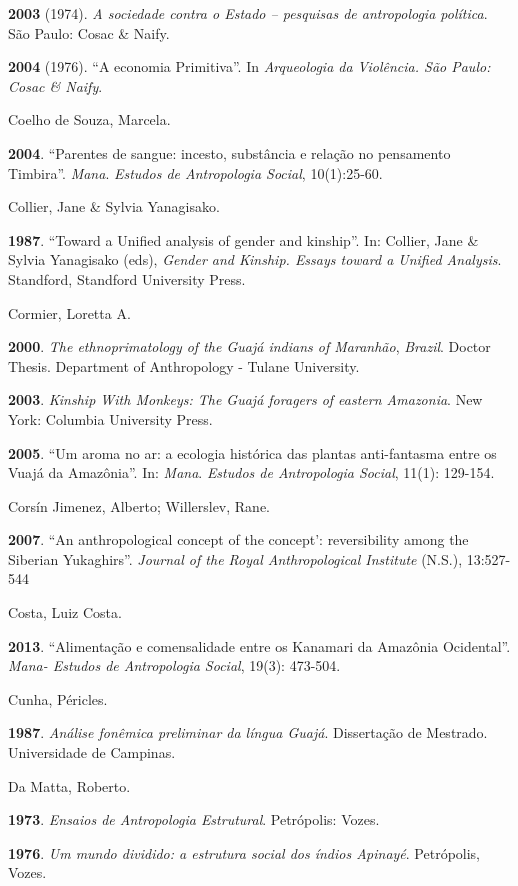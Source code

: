 \textbf{2003} (1974). \emph{A sociedade contra o Estado -- pesquisas de
antropologia política}. São Paulo: Cosac \& Naify.

\textbf{2004} (1976). ``A economia Primitiva''. In \emph{Arqueologia da
Violência. São Paulo: Cosac \& Naify}.

Coelho de Souza, Marcela.

\textbf{2004}. ``Parentes de sangue: incesto, substância e relação no
pensamento Timbira''. \emph{Mana}. \emph{Estudos de Antropologia
Social}, 10(1):25-60.

Collier, Jane \& Sylvia Yanagisako.

\textbf{1987}. ``Toward a Unified analysis of gender and kinship''. In:
Collier, Jane \& Sylvia Yanagisako (eds), \emph{Gender and Kinship.
Essays toward a Unified Analysis}. Standford, Standford University
Press.

Cormier, Loretta A.

\textbf{2000}. \emph{The ethnoprimatology of the Guajá indians of
Maranhão}, \emph{Brazil}. Doctor Thesis. Department of Anthropology -
Tulane University.

\textbf{2003}. \emph{Kinship With Monkeys: The Guajá foragers of eastern
Amazonia}. New York: Columbia University Press.

\textbf{2005}. ``Um aroma no ar: a ecologia histórica das plantas
anti-fantasma entre os Vuajá da Amazônia''. In: \emph{Mana}.
\emph{Estudos de Antropologia Social}, 11(1): 129-154.

Corsín Jimenez, Alberto; Willerslev, Rane.

\textbf{2007}. ``An anthropological concept of the concept':
reversibility among the Siberian Yukaghirs''. \emph{Journal of the Royal
Anthropological Institute} (N.S.), 13:527-544

Costa, Luiz Costa.

\textbf{2013}. ``Alimentação e comensalidade entre os Kanamari da
Amazônia Ocidental''. \emph{Mana- Estudos de Antropologia Social},
19(3): 473-504.

Cunha, Péricles.

\textbf{1987}. \emph{Análise fonêmica preliminar da língua Guajá}.
Dissertação de Mestrado. Universidade de Campinas.

Da Matta, Roberto.

\textbf{1973}. \emph{Ensaios de Antropologia Estrutural}. Petrópolis:
Vozes.

\textbf{1976}. \emph{Um mundo dividido: a estrutura social dos índios
Apinayé}. Petrópolis, Vozes.

